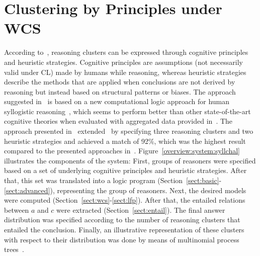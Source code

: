 \documentclass[12pt]{article}
\begin{document}
\section{Clustering by Principles under WCS} \label{sect:wcsclustering}

According to~\cite{declare:2017}, reasoning clusters can be expressed through cognitive principles and heuristic strategies. Cognitive principles are assumptions (not necessarily valid under CL) made by humans while reasoning, 
whereas heuristic strategies describe the methods that are applied when
conclusions are not derived by reasoning but instead based on structural patterns or {biases}.
The approach suggested in~\cite{declare:2017} is based on a new computational logic approach for human syllogistic reasoning~\cite{cogsci:2017}, which seems to perform better than other state-of-the-art cognitive theories when evaluated with aggregated data provided in~\cite{khemlani:2012}. 
The approach presented in~\cite{declare:2017} extended~\cite{cogsci:2017} by specifying three reasoning clusters and two heuristic strategies and achieved a match of 92\%, which was the highest result compared to the presented approaches in~\cite{khemlani:2012}.
Figure~\ref{overview:system:syllchal} illustrates the components of the system:
First, groups of reasoners were specified based on a set of underlying cognitive principles and heuristic strategies.
After that, this set was translated into a logic program (Section~\ref{sect:basic}-\ref{sect:advanced}), representing the group of reasoners.
Next, the desired models were computed (Section~\ref{sect:wcs}-\ref{sect:lfp}).
After that, the entailed relations between $a$ and $c$ were extracted (Section~\ref{sect:entail}). 
 The final answer distribution was specified according to the number of reasoning clusters 
that entailed the conclusion.
Finally, an illustrative representation of these clusters with respect to their distribution was done by means of multinomial process trees~\cite{Riefer1988}.
\end{document}
